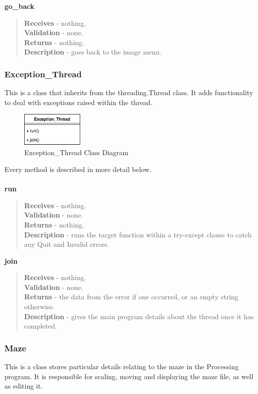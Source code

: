 \documentclass[titlepage]{article}
\begin{document}
\textbf{go\_back}
\begin{quote}
\textbf{Receives} - nothing. \\
\textbf{Validation} - none.\\
\textbf{Returns} - nothing. \\
\textbf{Description} - goes back to the image menu.
\end{quote}

\subsubsection{Exception\_Thread}
This is a class that inherits from the threading.Thread class. It adds functionality to deal with exceptions raised within the thread.

\begin{figure}[H]
  \centering
  \includegraphics[width=3cm]{Expcd.png}
  \caption{Exception\_Thread Class Diagram}
  \label{fig:dijk}
\end{figure}

Every method is described in more detail below. \\\\

\textbf{run}
\begin{quote}
\textbf{Receives} - nothing. \\
\textbf{Validation} - none.\\
\textbf{Returns} - nothing. \\
\textbf{Description} - runs the target function within a try-except clause to catch any Quit and Invalid errors.
\end{quote}

\textbf{join}
\begin{quote}
\textbf{Receives} - nothing. \\
\textbf{Validation} - none.\\
\textbf{Returns} - the data from the error if one occurred, or an empty string otherwise. \\
\textbf{Description} - gives the main program details about the thread once it has completed.
\end{quote}

\subsubsection{Maze}
This is a class stores particular details relating to the maze in the Processing program. It is responsible for scaling, moving and displaying the maze file, as well as editing it. 
\end{document}

